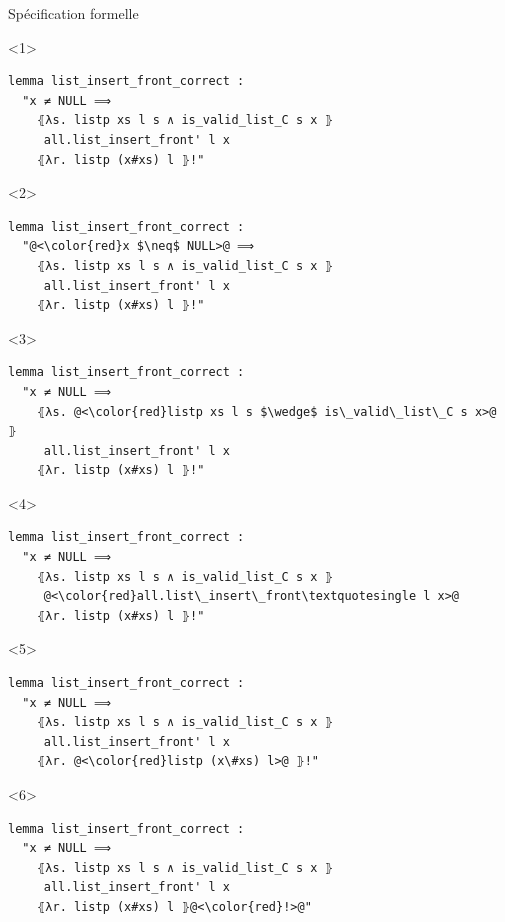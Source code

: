 \documentclass[hyperref={pdfpagelabels=false}]{beamer}
\begin{document}
\begin{frame}[fragile]{Spécification formelle}
  \begin{center}
    \begin{minipage}{0.8\textwidth}
      \begin{onlyenv}<1>
        \begin{lstlisting}
lemma list_insert_front_correct :
  "x ≠ NULL ⟹
    ⦃λs. listp xs l s ∧ is_valid_list_C s x ⦄
     all.list_insert_front' l x
    ⦃λr. listp (x#xs) l ⦄!"
        \end{lstlisting}
      \end{onlyenv}

    \begin{onlyenv}<2>
    \begin{lstlisting}
lemma list_insert_front_correct :
  "@<\color{red}x $\neq$ NULL>@ ⟹
    ⦃λs. listp xs l s ∧ is_valid_list_C s x ⦄
     all.list_insert_front' l x
    ⦃λr. listp (x#xs) l ⦄!"
    \end{lstlisting}
  \end{onlyenv}

  \begin{onlyenv}<3>
    \begin{lstlisting}
lemma list_insert_front_correct :
  "x ≠ NULL ⟹
    ⦃λs. @<\color{red}listp xs l s $\wedge$ is\_valid\_list\_C s x>@ ⦄
     all.list_insert_front' l x
    ⦃λr. listp (x#xs) l ⦄!"
    \end{lstlisting}
  \end{onlyenv}

  \begin{onlyenv}<4>
    \begin{lstlisting}
lemma list_insert_front_correct :
  "x ≠ NULL ⟹
    ⦃λs. listp xs l s ∧ is_valid_list_C s x ⦄
     @<\color{red}all.list\_insert\_front\textquotesingle l x>@
    ⦃λr. listp (x#xs) l ⦄!"
    \end{lstlisting}
  \end{onlyenv}

  \begin{onlyenv}<5>
    \begin{lstlisting}
lemma list_insert_front_correct :
  "x ≠ NULL ⟹
    ⦃λs. listp xs l s ∧ is_valid_list_C s x ⦄
     all.list_insert_front' l x
    ⦃λr. @<\color{red}listp (x\#xs) l>@ ⦄!"
    \end{lstlisting}
  \end{onlyenv}
  \begin{onlyenv}<6>
    \begin{lstlisting}
lemma list_insert_front_correct :
  "x ≠ NULL ⟹
    ⦃λs. listp xs l s ∧ is_valid_list_C s x ⦄
     all.list_insert_front' l x
    ⦃λr. listp (x#xs) l ⦄@<\color{red}!>@"
    \end{lstlisting}
  \end{onlyenv}
\end{minipage}
  \end{center}


\end{frame}
\end{document}
